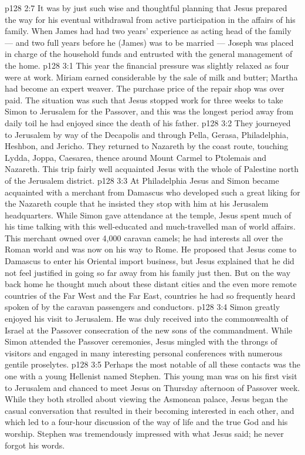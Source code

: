 \vs p128 2:7 It was by just such wise and thoughtful planning that Jesus prepared the way for his eventual withdrawal from active participation in the affairs of his family. When James had had two years’ experience as acting head of the family --- and two full years before he (James) was to be married --- Joseph was placed in charge of the household funds and entrusted with the general management of the home.
\vs p128 3:1 This year the financial pressure was slightly relaxed as four were at work. Miriam earned considerable by the sale of milk and butter; Martha had become an expert weaver. The purchase price of the repair shop was over  paid. The situation was such that Jesus stopped work for three weeks to take Simon to Jerusalem for the Passover, and this was the longest period away from daily toil he had enjoyed since the death of his father.
\vs p128 3:2 They journeyed to Jerusalem by way of the Decapolis and through Pella, Gerasa, Philadelphia, Heshbon, and Jericho. They returned to Nazareth by the coast route, touching Lydda, Joppa, Caesarea, thence around Mount Carmel to Ptolemais and Nazareth. This trip fairly well acquainted Jesus with the whole of Palestine north of the Jerusalem district.
\vs p128 3:3 At Philadelphia Jesus and Simon became acquainted with a merchant from Damascus who developed such a great liking for the Nazareth couple that he insisted they stop with him at his Jerusalem headquarters. While Simon gave attendance at the temple, Jesus spent much of his time talking with this well\hyp{}educated and much\hyp{}travelled man of world affairs. This merchant owned over 4,000 caravan camels; he had interests all over the Roman world and was now on his way to Rome. He proposed that Jesus come to Damascus to enter his Oriental import business, but Jesus explained that he did not feel justified in going so far away from his family just then. But on the way back home he thought much about these distant cities and the even more remote countries of the Far West and the Far East, countries he had so frequently heard spoken of by the caravan passengers and conductors.
\vs p128 3:4 Simon greatly enjoyed his visit to Jerusalem. He was duly received into the commonwealth of Israel at the Passover consecration of the new sons of the commandment. While Simon attended the Passover ceremonies, Jesus mingled with the throngs of visitors and engaged in many interesting personal conferences with numerous gentile proselytes.
\vs p128 3:5 Perhaps the most notable of all these contacts was the one with a young Hellenist named Stephen. This young man was on his first visit to Jerusalem and chanced to meet Jesus on Thursday afternoon of Passover week. While they both strolled about viewing the Asmonean palace, Jesus began the casual conversation that resulted in their becoming interested in each other, and which led to a four\hyp{}hour discussion of the way of life and the true God and his worship. Stephen was tremendously impressed with what Jesus said; he never forgot his words.

